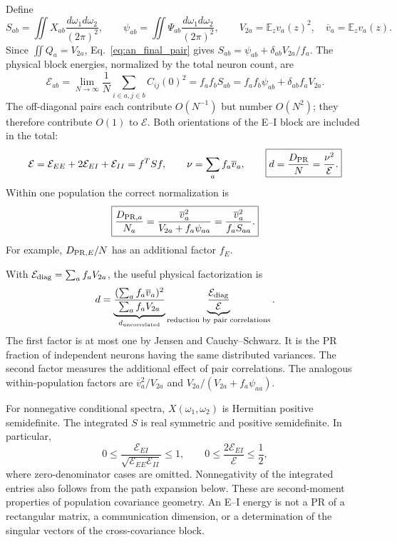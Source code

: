 Define
\begin{equation}
 S_{ab}=\iint X_{ab}\frac{d\omega_1d\omega_2}{(2\pi)^2},\qquad
 \psi_{ab}=\iint\Psi_{ab}\frac{d\omega_1d\omega_2}{(2\pi)^2},\qquad
 V_{2a}=\mathbb E_zv_a(z)^2,\quad \overline v_a=\mathbb E_zv_a(z).
\end{equation}
Since $\iint Q_a=V_{2a}$, Eq.~\eqref{eq:an_final_pair} gives
$S_{ab}=\psi_{ab}+\delta_{ab}V_{2a}/f_a$. The physical block energies,
normalized by the total neuron count, are
\begin{equation}
 \mathcal E_{ab}
 =\lim_{N\to\infty}\frac1N
           \sum_{i\in a,j\in b}C_{ij}(0)^2
 =f_af_bS_{ab}
 =f_af_b\psi_{ab}+\delta_{ab}f_aV_{2a}.
 \label{eq:an_blocks}
\end{equation}
The off-diagonal pairs each contribute $O(N^{-1})$ but number $O(N^2)$;
they therefore contribute $O(1)$ to $\mathcal E$. Both orientations of the
E--I block are included in the total:
\begin{equation}
 \mathcal E=\mathcal E_{EE}+2\mathcal E_{EI}+\mathcal E_{II}
           =f^TSf,\qquad
 \nu=\sum_af_a\overline v_a,\qquad
 \boxed{d=\frac{D_{\rm PR}}N=\frac{\nu^2}{\mathcal E}.}
 \label{eq:an_dimension}
\end{equation}
Within one population the correct normalization is
\begin{equation}
 \boxed{\frac{D_{{\rm PR},a}}{N_a}
    =\frac{\overline v_a^2}{V_{2a}+f_a\psi_{aa}}
    =\frac{\overline v_a^2}{f_aS_{aa}}.}
 \label{eq:an_restricted}
\end{equation}
For example, $D_{{\rm PR},E}/N$ has an additional factor $f_E$.

With $\mathcal E_{\rm diag}=\sum_af_aV_{2a}$, the useful physical
factorization is
\begin{equation}
 d=\underbrace{\frac{(\sum_af_a\overline v_a)^2}
                       {\sum_af_aV_{2a}}}_{d_{\rm uncorrelated}}
   \underbrace{\frac{\mathcal E_{\rm diag}}{\mathcal E}}_{
                    \text{reduction by pair correlations}}.
 \label{eq:an_factorization}
\end{equation}
The first factor is at most one by Jensen and Cauchy--Schwarz. It is the PR
fraction of independent neurons having the same distributed variances.
The second factor measures the additional effect of pair correlations.
The analogous within-population factors are
$\overline v_a^2/V_{2a}$ and $V_{2a}/(V_{2a}+f_a\psi_{aa})$.

For nonnegative conditional spectra, $X(\omega_1,\omega_2)$ is Hermitian
positive semidefinite. The integrated $S$ is real symmetric and positive
semidefinite. In particular,
\begin{equation}
 0\leq\frac{\mathcal E_{EI}}
              {\sqrt{\mathcal E_{EE}\mathcal E_{II}}}\leq1,
 \qquad
 0\leq\frac{2\mathcal E_{EI}}{\mathcal E}\leq\frac12,
 \label{eq:an_block_bounds}
\end{equation}
where zero-denominator cases are omitted. Nonnegativity of the integrated
entries also follows from the path expansion below. These are second-moment
properties of population covariance geometry. An E--I energy is not a PR of a
rectangular matrix, a communication dimension, or a determination of the
singular vectors of the cross-covariance block.

